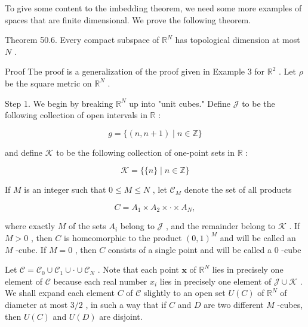 To give some content to the imbedding theorem, we need some more examples of spaces that are finite dimensional. We prove the following theorem.

Theorem 50.6. Every compact subspace of \({\mathbb{R}}^{N}\) has topological dimension at most \(N\) .

Proof The proof is a generalization of the proof given in Example 3 for \({\mathbb{R}}^{2}\) . Let \(\rho\) be the square metric on \({\mathbb{R}}^{N}\) .

Step 1. We begin by breaking \({\mathbb{R}}^{N}\) up into "unit cubes." Define \(\mathcal{J}\) to be the following collection of open intervals in \(\mathbb{R}\) :

\[
g = \{ \left( {n,n + 1}\right)  \mid  n \in  \mathbb{Z}\}
\]

and define \(\mathcal{K}\) to be the following collection of one-point sets in \(\mathbb{R}\) :

\[
\mathcal{K} = \{ \{ n\}  \mid  n \in  \mathbb{Z}\}
\]

If \(M\) is an integer such that \(0 \leq  M \leq  N\) , let \({\mathcal{C}}_{M}\) denote the set of all products

\[
C = {A}_{1} \times  {A}_{2} \times   \cdot   \times  {A}_{N},
\]

where exactly \(M\) of the sets \({A}_{i}\) belong to \(\mathcal{J}\) , and the remainder belong to \(\mathcal{K}\) . If \(M > 0\) , then \(C\) is homeomorphic to the product \({\left( 0,1\right) }^{M}\) and will be called an \(M\) -cube. If \(M = 0\) , then \(C\) consists of a single point and will be called a 0 -cube

Let \(\mathcal{C} = {\mathcal{C}}_{0} \cup  {\mathcal{C}}_{1} \cup   \cdot   \cup  {\mathcal{C}}_{N}\) . Note that each point \(\mathbf{x}\) of \({\mathbb{R}}^{N}\) lies in precisely one element of \(\mathcal{C}\) because each real number \({x}_{i}\) lies in precisely one element of \(\mathcal{J} \cup  \mathcal{K}\) . We shall expand each element \(C\) of \(\mathcal{C}\) slightly to an open set \(U\left( C\right)\) of \({\mathbb{R}}^{N}\) of diameter at most \(3/2\) , in such a way that if \(C\) and \(D\) are two different \(M\) -cubes, then \(U\left( C\right)\) and \(U\left( D\right)\) are disjoint.

